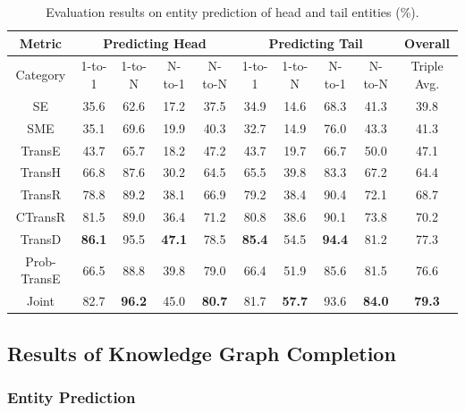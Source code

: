 \documentclass[11pt,a4paper]{article}
\begin{document}
\begin{table}[t]
\centering
\small
\begin{tabular}{|c|cccc|cccc|c|}
\hline
Metric            & \multicolumn{4}{c|}{Predicting Head} & \multicolumn{4}{c|}{Predicting Tail} & \multicolumn{1}{c|}{Overall} \\ \hline
Category  & 1-to-1     & 1-to-N    & N-to-1    & N-to-N    & 1-to-1     & 1-to-N    & N-to-1    & N-to-N  & Triple Avg. \\ \hline

SE &35.6 &62.6 &17.2 &37.5 &34.9 &14.6 &68.3 &41.3 &39.8  \\ 
SME &35.1 &69.6 &19.9 &40.3 &32.7 &14.9 &76.0 &43.3 &41.3  \\ 
TransE            & 43.7       & 65.7      & 18.2      & 47.2      & 43.7       & 19.7      & 66.7      & 50.0    & 47.1  \\ 
TransH     & 66.8       & 87.6      & 30.2      & 64.5      & 65.5       & 39.8      &83.3      & 67.2    & 64.4  \\ 
TransR     & 78.8       & 89.2      & 38.1      & 66.9      & 79.2       & 38.4      &90.4      & 72.1    & 68.7  \\ 
CTransR     & 81.5      & 89.0      & 36.4      & 71.2      & 80.8       & 38.6      &90.1      & 73.8    & 70.2  \\ 

TransD  &\textbf{86.1}  &95.5  &\textbf{47.1} &78.5  &\textbf{85.4} &54.5 &\textbf{94.4} &81.2  &77.3  \\ \hline


Prob-TransE      & 66.5       & 88.8      & 39.8      & 79.0      & 66.4       & 51.9      & 85.6      & 81.5    & 76.6  \\ 
Joint             &82.7 & \textbf{96.2} &45.0 & \textbf{80.7} &81.7& \textbf{57.7} & 93.6 &\textbf{84.0} & \textbf{79.3}  \\ \hline
\end{tabular}
\caption{Evaluation results on entity prediction of head and tail entities (\%).}
\label{t:entity}
\end{table}


\subsection{Results of Knowledge Graph Completion}

\subsubsection{Entity Prediction}
\end{document}
